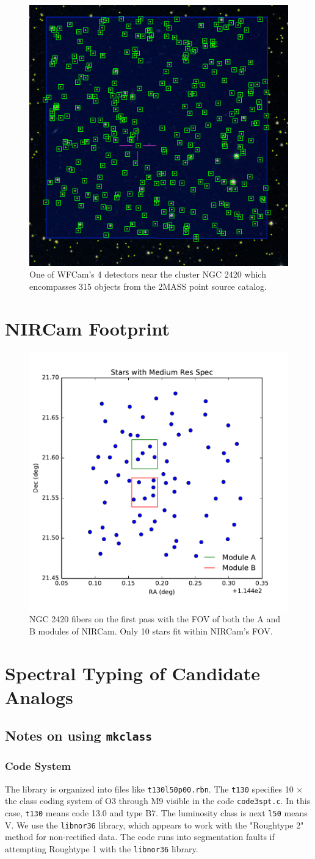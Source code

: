 \documentclass{aastex6}
\begin{document}
\begin{figure}[!hbtp]
\centering
\includegraphics[width=.4\columnwidth]{aladin_ngc2420_wfcam_square.png}
\caption{One of WFCam's 4 detectors near the cluster NGC 2420 which encompasses 315 objects from the 2MASS point source catalog.}\label{fig:wfcam3}
\end{figure}

\section{NIRCam Footprint}
\begin{figure}[!hbtp]
\centering
\includegraphics[width=.4\columnwidth]{nircam_fov_fibers.pdf}
\caption{NGC 2420 fibers on the first pass with the FOV of both the A and B modules of NIRCam.
Only 10 stars fit within NIRCam's FOV.}\label{fig:NCFOV}
\end{figure}

\section{Spectral Typing of Candidate Analogs}

\subsection{Notes on using \texttt{mkclass}}

\subsubsection{Code System}
The library is organized into files like \texttt{t130l50p00.rbn}.
The \texttt{t130} specifies 10 $\times$ the class coding system of O3 through M9 visible in the code \texttt{code3spt.c}.
In this case, \texttt{t130} means code 13.0 and type B7.
The luminosity class is next \texttt{l50} means V.
We use the \texttt{libnor36} library, which appears to work with the "Roughtype 2" method for non-rectified data.
The code runs into segmentation faults if attempting Roughtype 1 with the \texttt{libnor36} library.
\end{document}
